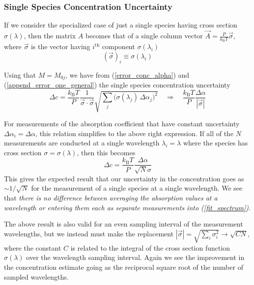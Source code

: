 \documentclass[8pt,a4paper]{report}
\begin{document}
	\subsubsection{Single Species Concentration Uncertainty}
	If we consider the specialized case of just a single species having cross section $\sigma(\lambda)$, then the matrix $A$ becomes that of a single column vector $\vec{A} = \frac{P}{k_\mathrm{B} T} \vec{\sigma}$, where $\vec{\sigma}$ is the vector having $i^\mathrm{th}$ component $\sigma(\lambda_i)$
	\begin{equation}
		\left(\vec{\sigma}\right)_i \equiv \sigma(\lambda_i)
	\end{equation}
	
	Using that $M=M_{0j}$, we have from (\ref{error_conc_alpha}) and (\ref{append_error_one_general}) the single species concentration uncertainty
	\begin{equation}\label{error_one_general}
		\Delta c = \frac{k_\mathrm{B}T}{P}\frac{1}{\vec{\sigma}\cdot\vec{\sigma}} \sqrt{\sum_j \Big(\sigma(\lambda_j) \, \Delta\alpha_j\Big)^2}
		\quad\Rightarrow\quad
		\frac{k_\mathrm{B}T}{P}\frac{\Delta \alpha}{\left|\vec{\sigma}\right|}
	\end{equation}
	
	For measurements of the absorption coefficient that have constant uncertainty $\Delta \alpha_i = \Delta \alpha$, this relation simplifies to the above right expression. If all of the $N$ measurements are conducted at a single wavelength $\lambda_i = \lambda$ where the species has cross section $\sigma = \sigma(\lambda)$, then this becomes
	\begin{equation}
		\Delta c = \frac{k_\mathrm{B} T}{P} \frac{\Delta \alpha}{\sqrt{N} \sigma}
	\end{equation}
	This gives the expected result that our uncertainty in the concentration goes as $\sim 1/\sqrt{N}$ for the measurement of a single species at a single wavelength. We see that \textit{there is no difference between averaging the absorption values at a wavelength or entering them each as separate measurements into (\ref{fit_spectrum})}.
	
	The above result is also valid for an even sampling interval of the measurement wavelengths, but we instead must make the replacement $\left|\vec{\sigma}\right| = \sqrt{\sum_i \sigma_i^2} \rightarrow \sqrt{C N}$, where the constant $C$ is related to the integral of the cross section function $\sigma(\lambda)$ over the wavelength sampling interval. Again we see the improvement in the concentration estimate going as the reciprocal square root of the number of sampled wavelengths.
	
\end{document}
